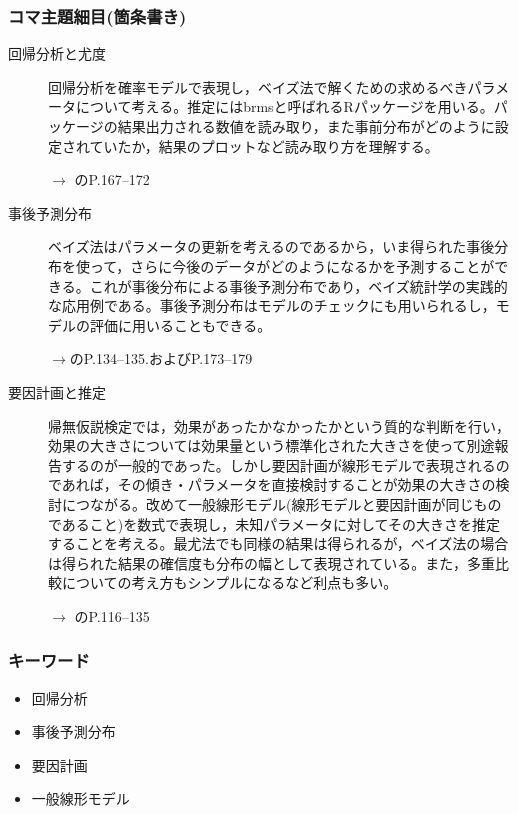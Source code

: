 \subsubsection{コマ主題細目(箇条書き)}
\begin{description}
\item[回帰分析と尤度]回帰分析を確率モデルで表現し，ベイズ法で解くための求めるべきパラメータについて考える。推定にはbrmsと呼ばれるRパッケージを用いる。パッケージの結果出力される数値を読み取り，また事前分布がどのように設定されていたか，結果のプロットなど読み取り方を理解する。
\begin{flushright}
    $\to$ \citet{馬場201907}のP.167--172
\end{flushright}

\item[事後予測分布]ベイズ法はパラメータの更新を考えるのであるから，いま得られた事後分布を使って，さらに今後のデータがどのようになるかを予測することができる。これが事後分布による事後予測分布であり，ベイズ統計学の実践的な応用例である。事後予測分布はモデルのチェックにも用いられるし，モデルの評価に用いることもできる。
\begin{flushright}
    $\to$\citet{馬場201907}のP.134--135.およびP.173--179
\end{flushright}

\item[要因計画と推定]帰無仮説検定では，効果があったかなかったかという質的な判断を行い，効果の大きさについては効果量という標準化された大きさを使って別途報告するのが一般的であった。しかし要因計画が線形モデルで表現されるのであれば，その傾き・パラメータを直接検討することが効果の大きさの検討につながる。改めて一般線形モデル(線形モデルと要因計画が同じものであること)を数式で表現し，未知パラメータに対してその大きさを推定することを考える。最尤法でも同様の結果は得られるが，ベイズ法の場合は得られた結果の確信度も分布の幅として表現されている。また，多重比較についての考え方もシンプルになるなど利点も多い。
\begin{flushright}
    $\to$ \citet{豊田201606}のP.116--135
\end{flushright}


\end{description}
\subsubsection{キーワード}
\begin{itemize}
\item 回帰分析
\item 事後予測分布
\item 要因計画
\item 一般線形モデル
\end{itemize}
